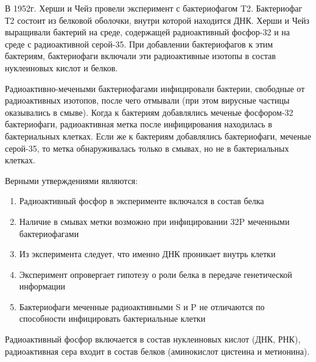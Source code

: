 
В 1952г. Херши и Чейз провели
эксперимент с  бактериофагом T2.
Бактериофаг Т2 состоит из белковой оболочки, внутри которой находится ДНК.
Херши и Чейз выращивали бактерий на среде, содержащей радиоактивный фосфор-32 и
на среде с радиоактивной серой-35. При добавлении бактериофагов к этим
бактериям, бактериофаги включали эти радиоактивные изотопы в состав нуклеиновых
кислот и белков. 

Радиоактивно-мечеными
бактериофагами инфицировали бактерии, свободные от радиоактивных изотопов,
после чего отмывали (при этом вирусные частицы оказывались в смыве). Когда к
бактериям добавлялись меченые фосфором-32 бактериофаги, радиоактивная метка
после инфицирования находилась в бактериальных клетках. Если же к бактериям
добавлялись бактериофаги, меченые серой-35, то метка обнаруживалась только в
смывах, но не в бактериальных клетках.


Верными утверждениями являются:

\begin{enumerate}
    \item Радиоактивный фосфор в эксперименте включался в состав белка
    \item Наличие в смывах метки возможно при инфицировании 32P меченными бактериофагами
    \item Из эксперимента следует, что именно ДНК проникает внутрь клетки
    \item Эксперимент опровергает гипотезу о роли белка в передаче генетической информации
    \item Бактериофаги меченные радиоактивными S и P не отличаются по способности инфицировать бактериальные клетки
\end{enumerate}

\explanationSection

Радиоактивный фосфор включается в состав нуклеиновых кислот (ДНК, РНК), радиоактивная сера входит 
в состав белков (аминокислот цистеина и метионина).

